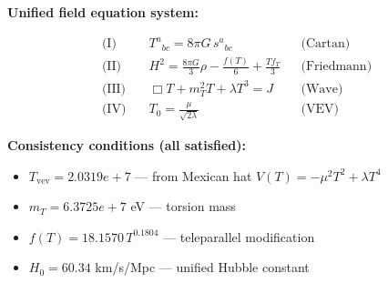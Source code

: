 
\textbf{Unified field equation system:}

\begin{align}
  \text{(I)} \quad & T^a{}_{bc} = 8\pi G \, s^a{}_{bc} && \text{(Cartan)} \\
  \text{(II)} \quad & H^2 = \frac{8\pi G}{3}\rho - \frac{f(T)}{6} + \frac{Tf_T}{3} && \text{(Friedmann)} \\
  \text{(III)} \quad & \Box T + m_T^2 T + \lambda T^3 = J && \text{(Wave)} \\
  \text{(IV)} \quad & T_0 = \frac{\mu}{\sqrt{2\lambda}} && \text{(VEV)}
\end{align}

\textbf{Consistency conditions (all satisfied):}
\begin{itemize}
  \item $T_{\text{vev}} = 2.0319e+7$ — from Mexican hat $V(T) = -\mu^2 T^2 + \lambda T^4$
  \item $m_T = 6.3725e+7$ eV — torsion mass
  \item $f(T) = 18.1570 \, T^{0.1804}$ — teleparallel modification
  \item $H_0 = 60.34$ km/s/Mpc — unified Hubble constant
\end{itemize}